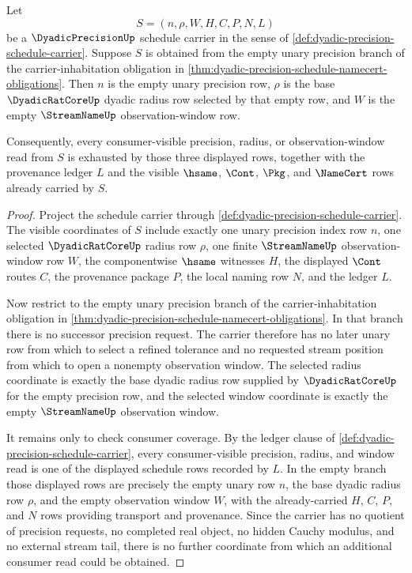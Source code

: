 \begin{theorem}
\label{thm:dyadic-precision-empty-schedule-exactness}
Let
$$
S=(n,\rho,W,H,C,P,N,L)
$$
be a $\DyadicPrecisionUp$ schedule carrier in the sense of \autoref{def:dyadic-precision-schedule-carrier}. Suppose $S$ is obtained from the empty unary precision branch of the carrier-inhabitation obligation in \autoref{thm:dyadic-precision-schedule-namecert-obligations}. Then $n$ is the empty unary precision row, $\rho$ is the base $\DyadicRatCoreUp$ dyadic radius row selected by that empty row, and $W$ is the empty $\StreamNameUp$ observation-window row.

Consequently, every consumer-visible precision, radius, or observation-window read from $S$ is exhausted by those three displayed rows, together with the provenance ledger $L$ and the visible $\hsame$, $\Cont$, $\Pkg$, and $\NameCert$ rows already carried by $S$.
\end{theorem}
\begin{proof}
Project the schedule carrier through \autoref{def:dyadic-precision-schedule-carrier}. The visible coordinates of $S$ include exactly one unary precision index row $n$, one selected $\DyadicRatCoreUp$ radius row $\rho$, one finite $\StreamNameUp$ observation-window row $W$, the componentwise $\hsame$ witnesses $H$, the displayed $\Cont$ routes $C$, the provenance package $P$, the local naming row $N$, and the ledger $L$.

Now restrict to the empty unary precision branch of the carrier-inhabitation obligation in \autoref{thm:dyadic-precision-schedule-namecert-obligations}. In that branch there is no successor precision request. The carrier therefore has no later unary row from which to select a refined tolerance and no requested stream position from which to open a nonempty observation window. The selected radius coordinate is exactly the base dyadic radius row supplied by $\DyadicRatCoreUp$ for the empty precision row, and the selected window coordinate is exactly the empty $\StreamNameUp$ observation window.

It remains only to check consumer coverage. By the ledger clause of \autoref{def:dyadic-precision-schedule-carrier}, every consumer-visible precision, radius, and window read is one of the displayed schedule rows recorded by $L$. In the empty branch those displayed rows are precisely the empty unary row $n$, the base dyadic radius row $\rho$, and the empty observation window $W$, with the already-carried $H$, $C$, $P$, and $N$ rows providing transport and provenance. Since the carrier has no quotient of precision requests, no completed real object, no hidden Cauchy modulus, and no external stream tail, there is no further coordinate from which an additional consumer read could be obtained.
\end{proof}


